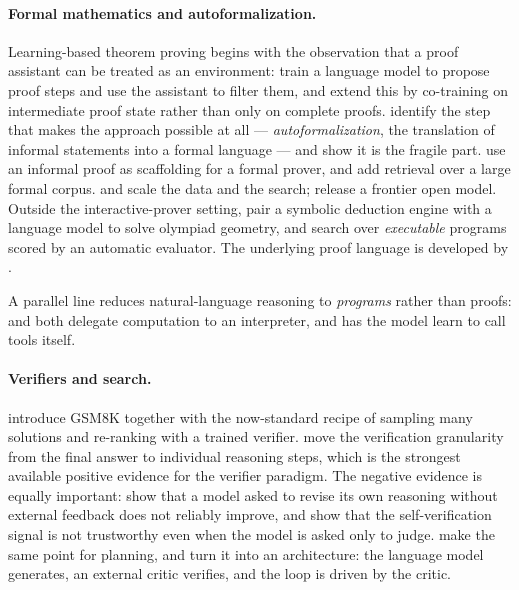 \documentclass[11pt,a4paper]{article}
\begin{document}
\paragraph{Formal mathematics and autoformalization.} Learning-based theorem
proving begins with the observation that a proof assistant can be treated as an
environment: \citet{polu2020gptf} train a language model to propose proof steps
and use the assistant to filter them, and \citet{han2022pact} extend this by
co-training on intermediate proof state rather than only on complete proofs.
\citet{wu2022autoformalization} identify the step that makes the approach
possible at all --- \emph{autoformalization}, the translation of informal
statements into a formal language --- and show it is the fragile part.
\citet{jiang2023dsp} use an informal proof as scaffolding for a formal prover,
and \citet{yang2023leandojo} add retrieval over a large formal corpus.
\citet{xin2024deepseekprover} and \citet{ren2025deepseekproverv2} scale the
data and the search; \citet{lin2025goedelprover} release a frontier open model.
Outside the interactive-prover setting, \citet{trinh2024alphageometry} pair a
symbolic deduction engine with a language model to solve olympiad geometry, and
\citet{romera2024funsearch} search over \emph{executable} programs scored by an
automatic evaluator. The underlying proof language is developed by
\citet{demoura2021lean4}.

A parallel line reduces natural-language reasoning to \emph{programs} rather
than proofs: \citet{gao2023pal} and \citet{chen2023pot} both delegate
computation to an interpreter, and \citet{schick2023toolformer} has the model
learn to call tools itself.

\paragraph{Verifiers and search.} \citet{cobbe2021gsm8k} introduce GSM8K
together with the now-standard recipe of sampling many solutions and
re-ranking with a trained verifier. \citet{lightman2024verify} move the
verification granularity from the final answer to individual reasoning steps,
which is the strongest available positive evidence for the verifier paradigm.
The negative evidence is equally important: \citet{huang2024selfcorrect} show
that a model asked to revise its own reasoning without external feedback does
not reliably improve, and \citet{stechly2024selfverification} show that the
self-verification signal is not trustworthy even when the model is asked only
to judge. \citet{valmeekam2023planning} make the same point for planning, and
\citet{kambhampati2024llmmodulo} turn it into an architecture: the language
model generates, an external critic verifies, and the loop is driven by the
critic.
\end{document}
